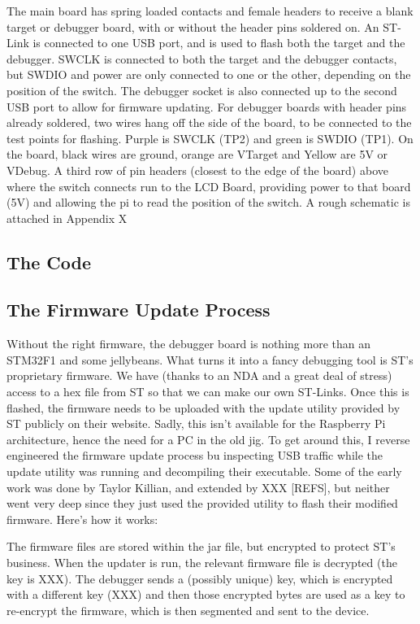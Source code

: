 \documentclass[a4paper]{article}
\begin{document}
The main board has spring loaded contacts and female headers to receive a blank target or debugger board, with or without the header pins soldered on. An ST-Link is connected to one USB port, and is used to flash both the target and the debugger. SWCLK is connected to both the target and the debugger contacts, but SWDIO and power are only connected to one or the other, depending on the position of the switch. The debugger socket is also connected up to the second USB port to allow for firmware updating. For debugger boards with header pins already soldered, two wires hang off the side of the board, to be connected to the test points for flashing. Purple is SWCLK (TP2) and green is SWDIO (TP1). On the board, black wires are ground, orange are VTarget and Yellow are 5V or VDebug. A third row of pin headers (closest to the edge of the board) above where the switch connects run to the LCD Board, providing power to that board (5V) and allowing the pi to read the position of the switch. A rough schematic is attached in Appendix X

\subsection{The Code}

\subsection{The Firmware Update Process}

Without the right firmware, the debugger board is nothing more than an STM32F1 and some jellybeans. What turns it into a fancy debugging tool is ST's proprietary firmware. We have (thanks to an NDA and a great deal of stress) access to a hex file from ST so that we can make our own ST-Links. Once this is flashed, the firmware needs to be uploaded with the update utility provided by ST publicly on their website. Sadly, this isn't available for the Raspberry Pi architecture, hence the need for a PC in the old jig. To get around this, I reverse engineered the firmware update process bu inspecting USB traffic while the update utility was running and decompiling their executable. Some of the early work was done by Taylor Killian, and extended by XXX [REFS], but neither went very deep since they just used the provided utility to flash their modified firmware. Here's how it works:

The firmware files are stored within the jar file, but encrypted to protect ST's business. When the updater is run, the relevant firmware file is decrypted (the key is XXX). The debugger sends a (possibly unique) key, which is encrypted with a different key (XXX) and then those encrypted bytes are used as a key to re-encrypt the firmware, which is then segmented and sent to the device. 
\end{document}
